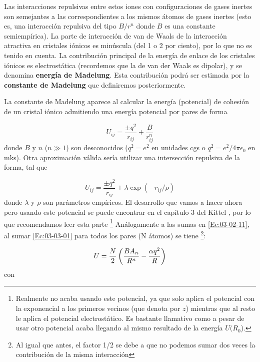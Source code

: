 Las interacciones repulsivas entre estos iones con configuraciones de gases inertes son semejantes a las correspondientes a los mismos átomos de gases inertes (esto es, una interacción repulsiva del tipo $B/r^n$ donde $B$ es una constante semiempírica). La parte de interacción de van de Waals de la interacción atractiva en cristales iónicos es minúscula (del 1 o 2 por ciento), por lo que no es tenido en cuenta. La contribución principal de la energía de enlace de los cristales iónicos es electrostática (recordemos que la de van der Waals es dipolar), y se denomina \textbf{energía de Madelung}. Esta contribución podrá ser estimada por la \textbf{constante de Madelung} que definiremos posteriormente. 

La constante de Madelung aparece al calcular la energía (potencial) de cohesión de un cristal iónico admitiendo una energía potencial por pares de forma 

\begin{equation}
    U_{ij} = \frac{\pm q^2}{r_{ij}} + \frac{B}{r_{ij}^n} \label{Ec:03-03-01}
\end{equation} 
donde $B$ y $n$ ($n\gg 1$) son desconocidos ($q^2 = e^2$ en unidades cgs o $q^2=e^2 / 4 \pi \epsilon_0$ en mks). Otra aproximación válida sería utilizar una intersección repulsiva de la forma, tal que 

\begin{equation*}
	U_{ij} = \frac{\pm q^2}{r_{ij}} + \lambda \exp(-r_{ij}/\rho) 
\end{equation*} 
donde $\lambda$ y $\rho$ son parámetros empíricos. El desarrollo que vamos a hacer ahora pero usando este potencial se puede encontrar en el capítulo 3 del Kittel \cite{Estado_Solido_Kittel}, por lo que recomendamos leer esta parte \footnote{Realmente no acaba usando este potencial, ya que solo aplica el potencial con la exponencial a los primeros vecinos (que denota por $z$) mientras que al resto le aplica el potencial electrostático. Es bastante llamativo como a pesar de usar otro potencial acaba llegando al mismo resultado de la energía $U(R_0$).} Análogamente a las sumas en \ref{Ec:03-02-11}, al sumar \ref{Ec:03-03-01} para todos los pares (N átomos) se tiene \footnote{Al igual que antes, el factor 1/2 se debe a que no podemos sumar dos veces la contribución de la misma interacción}:

\begin{equation}
    U = \frac{N}{2} \left( \frac{BA_n}{R^n}-\frac{\alpha q^2}{R} \right)
\end{equation}
con 

